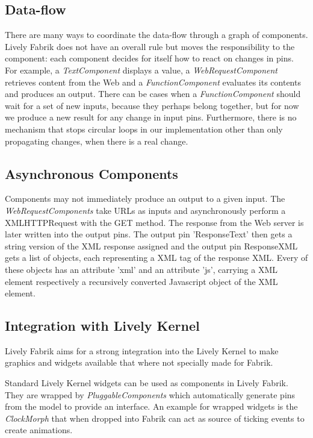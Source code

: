 \documentclass[pdftex, times, 10pt, twocolumn]{article}
\begin{document}
\subsection{Data-flow}
There are many ways to coordinate the data-flow through a graph of components. Lively Fabrik does not have an overall rule but moves the responsibility to the component: each component decides for itself how to react on changes in pins. For example, a {\em TextComponent} displays a value, a {\em WebRequestComponent} retrieves content from the Web and a {\em FunctionComponent} evaluates its contents and produces an output. There can be cases when a {\em FunctionComponent} should wait for a set of new inputs, because they perhaps belong together, but for now we produce a new result for any change in input pins. Furthermore, there is no mechanism that stops circular loops in our implementation other than only propagating changes, when there is a real change.  



\subsection{Asynchronous Components}
Components may not immediately produce an output to a given input. The {\em WebRequestComponents} take URLs as inputs and asynchronously perform a XMLHTTPRequest with the GET method. The response from the Web server is later written into the output pins. The output pin 'ResponseText' then gets a string version of the XML response assigned and the output pin ResponseXML gets a list of objects, each representing a XML tag of the response XML. Every of these objects has an attribute 'xml' and an attribute 'js', carrying a XML element respectively a recursively converted Javascript object of the XML element. 



\subsection{Integration with Lively Kernel}
Lively Fabrik aims for a strong integration into the Lively Kernel to make graphics and widgets available that where not specially made for Fabrik.  

Standard Lively Kernel widgets can be used as components in Lively Fabrik. They are wrapped by {\em PluggableComponents} which automatically generate pins from the model to provide an interface. An example for wrapped widgets is the {\em ClockMorph} that when dropped into Fabrik can act as source of ticking events to create animations. 
\end{document}
